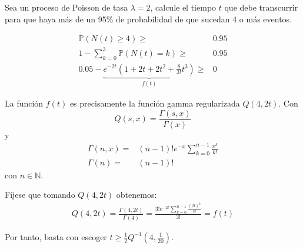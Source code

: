 \documentclass{upmassignment}
\date{\today}
\begin{document}
\begin{problemlist}
    \pbitem 
        Sea un proceso de Poisson de tasa $\lambda=2$,
calcule el tiempo $t$ que debe transcurrir
para que haya más de un 95\% de probabilidad
de que sucedan 4 o más eventos.

    \begin{solucion}
        \begin{align*}
            \mathbb{P}(N(t)\geq4)\geq&0.95\\
            1-\sum_{k=0}^3 \mathbb{P}(N(t)=k)
            \geq&0.95\\
            0.05-\underbrace{e^{-2t}\left(1+2t+2t^2+
            \frac{8}{3!}t^3\right)}_{f(t)}\geq&0
        \end{align*}

        La función $f(t)$ es precisamente
        la función gamma regularizada
        $Q(4,2t)$. Con
        \begin{equation*}
            Q(s,x)=\frac{\Gamma(s,x)}{\Gamma(x)}
        \end{equation*}
        y
        \begin{align*}
            \Gamma(n,x)=&(n-1)!e^{-x}
            \sum_{k=0}^{n-1}\frac{x^k}{k!}\\
            \Gamma(n) =& (n-1)!
        \end{align*}
        con $n\in\mathbb{N}$.

        Fíjese que tomando $Q(4,2t)$ obtenemos:
        \begin{multline*}
            Q(4,2t)=\frac{\Gamma(4,2t)}{\Gamma(4)}
            = \frac{3!e^{-2t}\sum_{k=0}^{n-1}\frac{(2t)^k}{k!}}{3!}
            = f(t)
        \end{multline*}

        Por tanto, basta con escoger
        $t\geq \tfrac{1}{2}Q^{-1}(4,\tfrac{1}{20})$.
    \end{solucion}

\end{problemlist}
\end{document}
